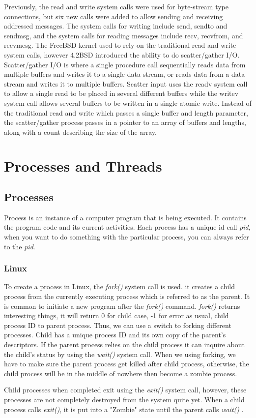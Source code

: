 \documentclass[10pt,draftclsnofoot,onecolumn,journal,compsoc]{IEEEtran}
\begin{document}
Previously, the read and write system calls were used for byte-stream type connections, but six new calls were added to allow sending and receiving addressed messages. The system calls for writing include send, sendto and sendmsg, and the system calls for reading messages include recv, recvfrom, and recvmesg. The FreeBSD kernel used to rely on the traditional read and write system calls, however 4.2BSD introduced the ability to do scatter/gather I/O. \cite{freebsd.org} Scatter/gather I/O is where a single procedure call sequentially reads data from multiple buffers and writes it to a single data stream, or reads data from a data stream and writes it to multiple buffers. Scatter input uses the readv system call to allow a single read to be placed in several different buffers while the writev system call allows several buffers to be written in a single atomic write. Instead of the traditional read and write which passes a single buffer and length parameter, the scatter/gather process passes in a pointer to an array of buffers and lengths, along with a count describing the size of the array.

\section{Processes and Threads}
\subsection{Processes}
Process is an instance of a computer program that is being executed. It contains the program code and its current activities. Each process has a unique id call \textit{pid}, when you want to do something with the particular process, you can always refer to the \textit{pid}. 
\subsubsection*{Linux}
To create a process in Linux, the \textit{fork()} system call is used. it creates a child process from the currently executing process which is referred to as the parent. It is common to initiate a new program after the \textit{fork()} command. \textit{fork()} returns interesting things, it will return 0 for child case, -1 for error as usual, child process ID to parent process. Thus, we can use a switch to forking different processes. 
Child has a unique process ID and its own copy of the parent's descriptors. 
If the parent process relies on the child process it can inquire about the child's status by using the \textit{wait()} system call. 
When we using forking, we have to make sure the parent process get killed after child process, otherwise, the child process will be in the middle of nowhere then become a zombie process.\par
Child processes when completed exit using the \textit{exit()} system call, however, these processes are not completely destroyed from the system quite yet. When a child process calls \textit{exit()}, it is put into a "Zombie" state until the parent calls \textit{wait()} \cite{Love}.
\end{document}
